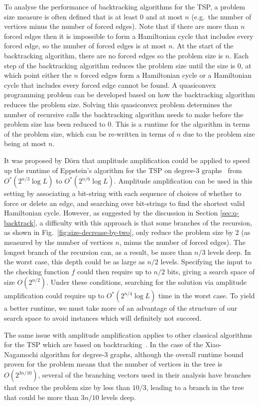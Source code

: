 To analyse the performance of backtracking algorithms for the TSP, a problem size measure is often defined that is at least 0 and at most $n$ (e.g.\ the number of vertices minus the number of forced edges). Note that if there are more than $n$ forced edges then it is impossible to form a Hamiltonian cycle that includes every forced edge, so the number of forced edges is at most $n$. At the start of the backtracking algorithm, there are no forced edges so the problem size is $n$. Each step of the backtracking algorithm reduces the problem size until the size is $0$, at which point either the $n$ forced edges form a Hamiltonian cycle or a Hamiltonian cycle that includes every forced edge cannot be found. A quasiconvex programming problem can be developed based on how the backtracking algorithm reduces the problem size. Solving this quasiconvex problem determines the number of recursive calls the backtracking algorithm needs to make before the problem size has been reduced to $0$. This is a runtime for the algorithm in terms of the problem size, which can be re-written in terms of $n$ due to the problem size being at most $n$.

It was proposed by D\"orn \cite{dorn2007} that amplitude amplification could be applied to speed up the runtime of Eppstein's algorithm for the TSP on degree-3 graphs~\cite{eppstein2007} from $O^*(2^{n/3}\log L)$ to $O^*(2^{n/6}\log L)$. Amplitude amplification can be used in this setting by associating a bit-string with each sequence of choices of whether to force or delete an edge, and searching over bit-strings to find the shortest valid Hamiltonian cycle. However, as suggested by the discussion in Section \ref{sec:q-backtrack}, a difficulty with this approach is that some branches of the recursion, as shown in Fig.~\ref{fig:size-decrease-by-two}, only reduce the problem size by 2 (as measured by the number of vertices $n$, minus the number of forced edges). The longest branch of the recursion can, as a result, be more than $n/3$ levels deep. In the worst case, this depth could be as large as $n/2$ levels. Specifying the input to the checking function $f$ could then require up to $n/2$ bits, giving a search space of size $O(2^{n/2})$. Under these conditions, searching for the solution via amplitude amplification could require up to $O^*(2^{n/4}\log L)$ time in the worst case. To yield a better runtime, we must take more of an advantage of the structure of our search space to avoid instances which will definitely not succeed.

The same issue with amplitude amplification applies to other classical algorithms for the TSP which are based on backtracking~\cite{xiao2016degree3,xiao2016degree4}. In the case of the Xiao-Nagamochi algorithm for degree-3 graphs, although the overall runtime bound proven for the problem means that the number of vertices in the tree is $O(2^{3n/10})$, several of the branching vectors used in their analysis have branches that reduce the problem size by less than $10/3$, leading to a branch in the tree that could be more than $3n/10$ levels deep.

